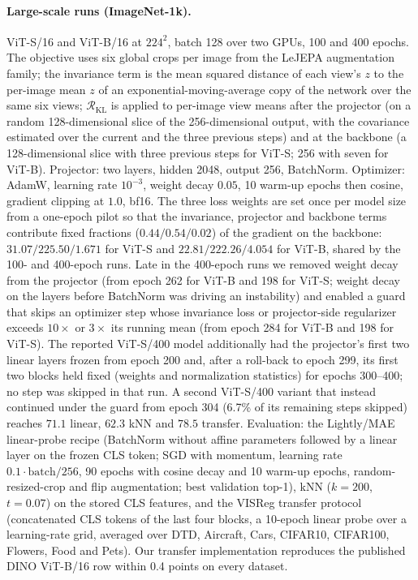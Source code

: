 \paragraph{Large-scale runs (ImageNet-1k).}
ViT-S/16 and ViT-B/16 at $224^2$, batch 128 over two GPUs, 100 and 400 epochs. The objective uses six global crops per image from the LeJEPA augmentation family; the invariance term is the mean squared distance of each view's $z$ to the per-image mean $z$ of an exponential-moving-average copy of the network over the same six views; $\mathcal{R}_{\mathrm{KL}}$ is applied to per-image view means after the projector (on a random 128-dimensional slice of the 256-dimensional output, with the covariance estimated over the current and the three previous steps) and at the backbone (a 128-dimensional slice with three previous steps for ViT-S; 256 with seven for ViT-B). Projector: two layers, hidden 2048, output 256, BatchNorm. Optimizer: AdamW, learning rate $10^{-3}$, weight decay $0.05$, 10 warm-up epochs then cosine, gradient clipping at $1.0$, bf16. The three loss weights are set once per model size from a one-epoch pilot so that the invariance, projector and backbone terms contribute fixed fractions ($0.44 / 0.54 / 0.02$) of the gradient on the backbone: $31.07 / 225.50 / 1.671$ for ViT-S and $22.81 / 222.26 / 4.054$ for ViT-B, shared by the 100- and 400-epoch runs. Late in the 400-epoch runs we removed weight decay from the projector (from epoch 262 for ViT-B and 198 for ViT-S; weight decay on the layers before BatchNorm was driving an instability) and enabled a guard that skips an optimizer step whose invariance loss or projector-side regularizer exceeds $10\times$ or $3\times$ its running mean (from epoch 284 for ViT-B and 198 for ViT-S). The reported ViT-S/400 model additionally had the projector's first two linear layers frozen from epoch 200 and, after a roll-back to epoch 299, its first two blocks held fixed (weights and normalization statistics) for epochs 300--400; no step was skipped in that run. A second ViT-S/400 variant that instead continued under the guard from epoch 304 (6.7\% of its remaining steps skipped) reaches $71.1$ linear, $62.3$ kNN and $78.5$ transfer. Evaluation: the Lightly/MAE linear-probe recipe (BatchNorm without affine parameters followed by a linear layer on the frozen CLS token; SGD with momentum, learning rate $0.1\cdot\mathrm{batch}/256$, 90 epochs with cosine decay and 10 warm-up epochs, random-resized-crop and flip augmentation; best validation top-1), kNN ($k{=}200$, $t{=}0.07$) on the stored CLS features, and the VISReg transfer protocol (concatenated CLS tokens of the last four blocks, a 10-epoch linear probe over a learning-rate grid, averaged over DTD, Aircraft, Cars, CIFAR10, CIFAR100, Flowers, Food and Pets). Our transfer implementation reproduces the published DINO ViT-B/16 row within 0.4 points on every dataset.

